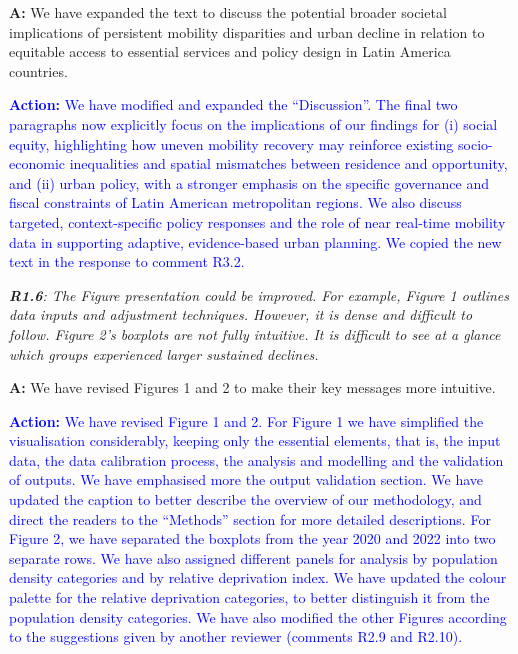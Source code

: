 \documentclass[12pt,a4paper,oneside, reqno]{amsart}
\begin{document}
\setlength{\leftskip}{1cm}\textbf{A:} We have expanded the text to discuss the potential broader societal implications of persistent mobility disparities and urban decline in relation to equitable access to essential services and policy design in Latin America countries. 

\textcolor{blue}{
\textbf{Action:} We have modified and expanded the ``Discussion''. The final two paragraphs now explicitly focus on the implications of our findings for (i) social equity, highlighting how uneven mobility recovery may reinforce existing socio-economic inequalities and spatial mismatches between residence and opportunity, and (ii) urban policy, with a stronger emphasis on the specific governance and fiscal constraints of Latin American metropolitan regions. We also discuss targeted, context-specific policy responses and the role of near real-time mobility data in supporting adaptive, evidence-based urban planning. We copied the new text in the response to comment R3.2.
}

\setlength{\leftskip}{0cm} \textit{\textbf{R1.6}: The Figure presentation could be improved. For example, Figure 1 outlines data inputs and adjustment techniques. However, it is dense and difficult to follow. Figure 2’s boxplots are not fully intuitive. It is difficult to see at a glance which groups experienced larger sustained declines.
}

\setlength{\leftskip}{1cm}\textbf{A:} We have revised Figures 1 and 2 to make their key messages more intuitive.

\textcolor{blue}{
\textbf{Action:} We have revised Figure 1 and 2. For Figure 1 we have simplified the visualisation considerably, keeping only the essential elements, that is, the input data, the data calibration process, the analysis and modelling and the validation of outputs. We have emphasised more the output validation section. We have updated the caption to better describe the overview of our methodology, and direct the readers to the ``Methods'' section for more detailed descriptions. For Figure 2, we have separated the boxplots from the year 2020 and 2022 into two separate rows. We have also assigned different panels for analysis by population density categories and by relative deprivation index. We have updated the colour palette for the relative deprivation categories, to better distinguish it from the population density categories. We have also modified the other Figures according to the suggestions given by another reviewer (comments R2.9 and R2.10).
}
\end{document}
